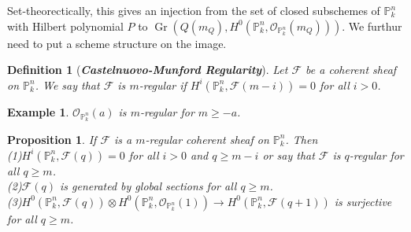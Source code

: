 \documentclass{ctexart}
\newtheorem{definition}{Definition}[section]
\newtheorem{proposition}{Proposition}[section]
\newtheorem{example}{Example}[section]
\newcommand{\grassmannianscheme}[2]{\operatorname{Gr}(#1, #2)}
\begin{document}
Set-theorectically, this gives an injection from the set of closed subschemes of $\mathbb{P}_{k}^{n}$ with Hilbert polynomial $P$ to $\grassmannianscheme{Q(m_{Q})}{H^{0}(\mathbb{P}_{k}^{n}, \mathcal{O}_{\mathbb{P}_{k}^{n}}(m_{Q}))}$.
We furthur need to put a scheme structure on the image.
\begin{definition}[\textbf{\emph{Castelnuovo-Munford Regularity}}]
    Let $\mathcal{F}$ be a coherent sheaf on $\mathbb{P}_{k}^{n}$.
    We say that $\mathcal{F}$ is $m$-regular if $H^{i}(\mathbb{P}_{k}^{n}, \mathcal{F}(m - i)) = 0$ for all $i > 0$.
\end{definition}
\begin{example}
    $\mathcal{O}_{\mathbb{P}_{k}^{n}}(a)$ is $m$-regular for $m \ge -a$.
\end{example}
\begin{proposition}
    If $\mathcal{F}$ is a $m$-regular coherent sheaf on $\mathbb{P}_{k}^{n}$.
    Then \\
    (1)$H^{i}(\mathbb{P}_{k}^{n}, \mathcal{F}(q)) = 0$ for all $i > 0$ and $q \ge m - i$ or say that $\mathcal{F}$ is $q$-regular for all $q \ge m$. \\
    (2)$\mathcal{F}(q)$ is generated by global sections for all $q \ge m$. \\
    (3)$H^{0}(\mathbb{P}_{k}^{n}, \mathcal{F}(q)) \otimes H^{0}(\mathbb{P}_{k}^{n}, \mathcal{O}_{\mathbb{P}_{k}^{n}}(1)) \longrightarrow H^{0}(\mathbb{P}_{k}^{n}, \mathcal{F}(q + 1))$ is surjective for all $q \ge m$.
    \label{Proposition 13.1}
\end{proposition}
\end{document}
